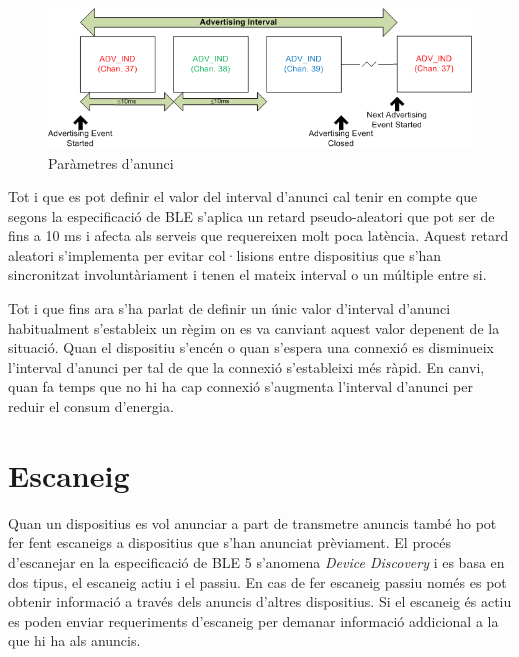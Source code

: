 \begin{figure}[h!]
	\begin{center}
		\includegraphics{./images/advertisement_params.png}
		\caption{Paràmetres d'anunci \cite{advertisment_params}}
		\label{fig:advertisment_params}
	\end{center}
\end{figure}

Tot i que es pot definir el valor del interval d'anunci cal tenir en compte que segons la especificació de BLE s'aplica un retard pseudo-aleatori que pot ser de fins a 10 ms i afecta als serveis que requereixen molt poca latència.
Aquest retard aleatori s'implementa per evitar col·lisions entre dispositius que s'han sincronitzat involuntàriament i tenen el mateix interval o un múltiple entre si.

Tot i que fins ara s'ha parlat de definir un únic valor d'interval d'anunci habitualment s'estableix un règim on es va canviant aquest valor depenent de la situació.
Quan el dispositiu s'encén o quan s'espera una connexió es disminueix l'interval d'anunci per tal de que la connexió s'estableixi més ràpid.
En canvi, quan fa temps que no hi ha cap connexió s'augmenta l'interval d'anunci per reduir el consum d'energia. 


\section{Escaneig}
Quan un dispositius es vol anunciar a part de transmetre anuncis també ho pot fer fent escaneigs a dispositius que s'han anunciat prèviament.
El procés d'escanejar en la especificació de BLE 5 s'anomena \textit{Device Discovery} i es basa en dos tipus, el escaneig actiu i el passiu.
En cas de fer escaneig passiu només es pot obtenir informació a través dels anuncis d'altres dispositius.
Si el escaneig és actiu es poden enviar requeriments d'escaneig per demanar informació addicional a la que hi ha als anuncis.

